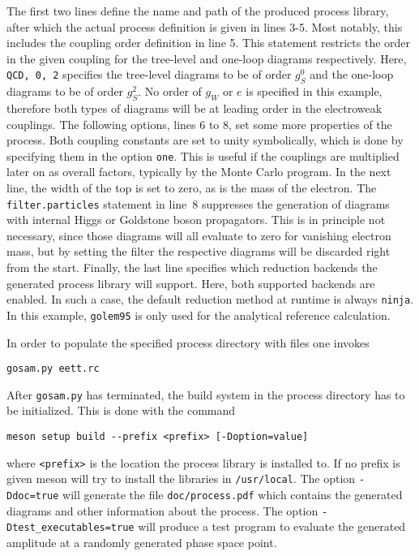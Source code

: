 The first two lines define the name and path of the produced process library, after which the actual process definition is given in lines 3-5. Most notably, this includes the coupling order definition in line 5. This statement restricts the order in the given coupling for the tree-level and one-loop diagrams respectively. Here, \texttt{QCD, 0, 2} specifies the tree-level diagrams to be of order $g_S^0$ and the one-loop diagrams to be of order $g_S^2$. No order of $g_W$ or $e$ is specified in this example, therefore both types of diagrams will be at leading order in the electroweak couplings.
The following options, lines 6 to 8, set some more properties of the process. Both coupling constants are set to unity symbolically, which is done by specifying them in the option \texttt{one}. This is useful if the couplings are multiplied later on as overall factors, typically by the Monte Carlo program. In the next line, the width of the top is set to zero, as is the mass of the electron. The \texttt{filter.particles} statement in line~8 suppresses the generation of diagrams with internal Higgs or Goldstone boson propagators. This is in principle not necessary, since those diagrams will all evaluate to zero for vanishing electron mass, but by setting the filter the respective diagrams will be discarded right from the start. Finally, the last line specifies which reduction backends the generated process library will support. Here, both supported backends are enabled. In such a case, the default reduction method at runtime is always \texttt{ninja}. In this example, \texttt{golem95} is only used for the analytical reference calculation.

In order to populate the specified process directory with files
one invokes
\begin{lstlisting}[style=sh]
gosam.py eett.rc
\end{lstlisting}

After \texttt{gosam{.}py} has terminated, the build system in the process directory has to be initialized. This is done with the command
\begin{lstlisting}[style=sh]
meson setup build --prefix <prefix> [-Doption=value]
\end{lstlisting}
where \texttt{<prefix>} is the location the process library is installed to. If no prefix is given meson will try to install the libraries in \texttt{/usr/local}.  The option \texttt{-Ddoc=true} will generate the file \texttt{doc/process.pdf} which contains the generated diagrams and other information about the process. The option \texttt{-Dtest\_executables=true} will produce a test program to evaluate the generated amplitude at a randomly generated phase space point.

